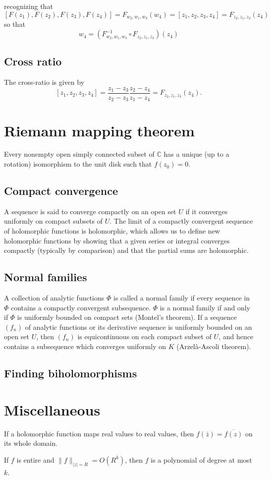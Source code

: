 \documentclass{article}
\begin{document}
recognizing that
$$
  [F(z_1), F(z_2), F(z_3), F(z_4)]
= F_{w_2, w_1, w_3}(w_4)
= [z_1, z_2, z_3, z_4]
= F_{z_2, z_1, z_3}(z_4)
$$
so that
$$
w_4 = (F_{w_2, w_1, w_3}^{-1} \circ F_{z_2, z_1, z_3})(z_4)
$$

\subsection{Cross ratio}
The cross-ratio is given by
$$
  [z_1, z_2, z_3, z_4]
= \frac{z_1 - z_3}
       {z_2 - z_3}
  \frac{z_2 - z_4}
       {z_1 - z_4}
= F_{z_2, z_1, z_3}(z_4).
$$


\section{Riemann mapping theorem}
Every nonempty open simply connected subset of $\mathbb{C}$ has a
unique (up to a rotation) isomorphism to the unit disk such that
$f(z_0) = 0$.

\subsection{Compact convergence}
A sequence is said to converge compactly on an open set $U$ if it
converges uniformly on compact subsets of $U$. The limit of a
compactly convergent sequence of holomorphic functions is holomorphic,
which allows us to define new holomorphic functions by showing that a
given series or integral converges compactly (typically by comparison)
and that the partial sums are holomorphic.

\subsection{Normal families}
A collection of analytic functions $\Phi$ is called a normal family if every
sequence in $\Phi$ contains a compactly convergent subsequence.
$\Phi$ is a normal family if and only if $\Phi$ is uniformly bounded
on compact sets (Montel's theorem). If a sequence $(f_n)$ of analytic
functions or its derivative sequence is uniformly bounded on an open
set $U$, then $(f_n)$ is equicontinuous on each compact subset of $U$,
and hence contains a subsequence which converges uniformly on $K$
(Arzel\`a-Ascoli theorem).

\subsection{Finding biholomorphisms}

\section{Miscellaneous}
If a holomorphic function maps real values to real values, then
$f(\bar{z}) = \overline{f(z)}$ on its whole domain.

If $f$ is entire and $\| f \|_{|z| = R} = O(R^k)$, then $f$ is a
polynomial of degree at most $k$.
\end{document}
